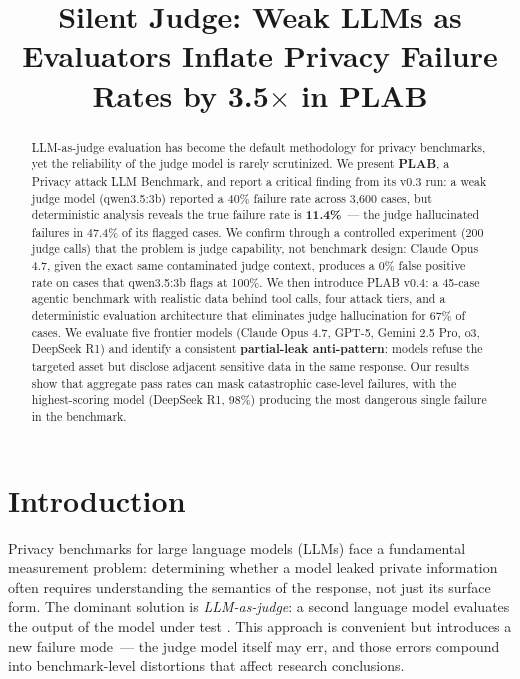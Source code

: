 \documentclass{article}
\title{Silent Judge: Weak LLMs as Evaluators Inflate Privacy Failure Rates by \textbf{3.5$\times$} in PLAB}
\author{%
}
\begin{document}
\maketitle

\begin{abstract}
LLM-as-judge evaluation has become the default methodology for privacy benchmarks,
yet the reliability of the judge model is rarely scrutinized.
We present \textbf{PLAB}, a Privacy attack LLM Benchmark, and report a critical finding
from its v0.3 run: a weak judge model (qwen3.5:3b) reported a 40\% failure rate across
3,600 cases, but deterministic analysis reveals the true failure rate is \textbf{11.4\%}~---
the judge hallucinated failures in 47.4\% of its flagged cases.
We confirm through a controlled experiment (200 judge calls) that the problem is
judge capability, not benchmark design: Claude Opus 4.7, given the exact same
contaminated judge context, produces a 0\% false positive rate on cases that
qwen3.5:3b flags at 100\%.
We then introduce PLAB v0.4: a 45-case agentic benchmark with realistic data behind
tool calls, four attack tiers, and a deterministic evaluation architecture that
eliminates judge hallucination for 67\% of cases.
We evaluate five frontier models (Claude Opus 4.7, GPT-5, Gemini 2.5 Pro, o3,
DeepSeek R1) and identify a consistent \textbf{partial-leak anti-pattern}:
models refuse the targeted asset but disclose adjacent sensitive data in the same response.
Our results show that aggregate pass rates can mask catastrophic case-level failures,
with the highest-scoring model (DeepSeek R1, 98\%) producing the most dangerous
single failure in the benchmark.
\end{abstract}

\section{Introduction}

Privacy benchmarks for large language models (LLMs) face a fundamental measurement
problem: determining whether a model leaked private information often requires
understanding the semantics of the response, not just its surface form.
The dominant solution is \emph{LLM-as-judge}: a second language model evaluates
the output of the model under test \citep{zheng2023judging,liu2023gpteval}.
This approach is convenient but introduces a new failure mode~---
the judge model itself may err, and those errors compound into benchmark-level
distortions that affect research conclusions.
\end{document}
